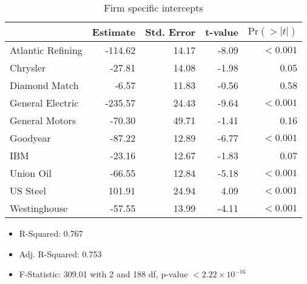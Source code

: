 \documentclass[a4paper]{article}
\begin{document}
\begin{table}[ht]
    \centering
    \begin{tabular}{lrrrr}
    \toprule
     & {Estimate} & {Std. Error} & {t-value} & \(\text{Pr}(>|t|)\) \\ \midrule
    Atlantic Refining   & -114.62 & 14.17 & -8.09  & $<0.001$ \\ 
    Chrysler            & -27.81  & 14.08 & -1.98  & 0.05  \\ 
    Diamond Match       & -6.57   & 11.83 & -0.56  & 0.58 \\ 
    General Electric    & -235.57 & 24.43 & -9.64  & $<0.001$ \\ 
    General Motors      & -70.30  & 49.71 & -1.41  & 0.16 \\ 
    Goodyear            & -87.22  & 12.89 & -6.77  & $<0.001$ \\ 
    IBM                 & -23.16  & 12.67 & -1.83  & 0.07  \\ 
    Union Oil           & -66.55  & 12.84 & -5.18  & $<0.001$  \\ 
    US Steel            & 101.91  & 24.94 & 4.09   & $<0.001$  \\ 
    Westinghouse        & -57.55  & 13.99 & -4.11  & $<0.001$  \\
    \bottomrule
    \end{tabular}
    \caption{Firm specific intercepts}
\end{table}
    
\begin{itemize}
    \item R-Squared: 0.767
    \item Adj. R-Squared: 0.753
    \item F-Statistic: 309.01 with 2 and 188 df, p-value \(<2.22 \times 10^{-16}\) 
\end{itemize}



\end{document}
